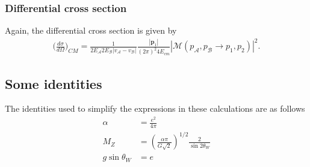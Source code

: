 \documentclass[11pt]{article}
\begin{document}
\subsubsection{Differential cross section}
\begin{flushleft}
Again, the differential cross section is given by
\begin{align*}
\Big( \frac{d \sigma}{d \Omega} \Big)_{CM} = \frac{1}{2E_{\mathcal{A}}2 E_{\mathcal{B}} |v_{\mathcal{A}}-v_{\mathcal{B}}|} \frac{|\textbf{p}_1|}{(2 \pi)^2 4 E_{cm}}|\mathcal{M}(p_{\mathcal{A}}, p_{\mathcal{B}} \rightarrow p_1, p_2)|^2.
\end{align*}
\end{flushleft}

\subsection{Some identities}
\begin{flushleft}
The identities used to simplify the expressions in these calculations are as follows \cite{mandl2010quantum}
\begin{align}
\alpha &= \frac{e^2}{4 \pi}\\
M_Z &= (\frac{\alpha \pi}{G \sqrt{2}})^{1/2} \frac{2}{\sin 2 \theta_W}\\
g \sin \theta_W &= e 
\end{align}
\end{flushleft}






\end{document}

